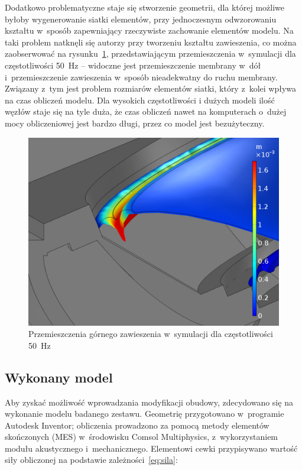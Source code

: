 \documentclass[12pt]{oska}
\begin{document}
	Dodatkowo problematyczne staje się stworzenie geometrii, dla której możliwe byłoby wygenerowanie siatki elementów, przy jednoczesnym odwzorowaniu kształtu w~sposób zapewniający rzeczywiste zachowanie elementów modelu. Na taki problem natknęli się autorzy przy tworzeniu kształtu zawieszenia, co można zaobserwować na rysunku~\ref{r:zawieszenie}, przedstawiającym przemieszczenia w~symulacji dla częstotliwości \SI{50}{\hertz} -- widoczne jest przemieszczenie membrany w~dół i~przemieszczenie zawieszenia w~sposób nieadekwatny do ruchu membrany.
	Związany z~tym jest problem rozmiarów elementów siatki, który z~kolei wpływa na czas obliczeń modelu. Dla wysokich częstotliwości i dużych modeli ilość węzłów staje się na tyle duża, że czas obliczeń nawet na komputerach o~dużej mocy obliczeniowej jest bardzo długi, przez co model jest bezużyteczny.
	
	\begin{figure}[!ht]
		\centering
		\includegraphics[width=.7\textwidth]{disp_factor5_f50_02.png}
		\caption{Przemieszczenia górnego zawieszenia w~symulacji dla częstotliwości \SI{50}{\hertz}}
		\label{r:zawieszenie}
	\end{figure}
	
	\subsection{Wykonany model}
	
	Aby zyskać możliwość wprowadzania modyfikacji obudowy, zdecydowano się na wykonanie modelu badanego zestawu. Geometrię przygotowano w~programie Autodesk Inventor; obliczenia prowadzono za pomocą metody elementów skończonych (MES) w~środowisku Comsol Multiphysics, z~wykorzystaniem modułu akustycznego i~mechanicznego. Elementowi cewki przypisywano wartość siły obliczonej na podstawie zależności~\eqref{eq:sila}:
	
\end{document}
